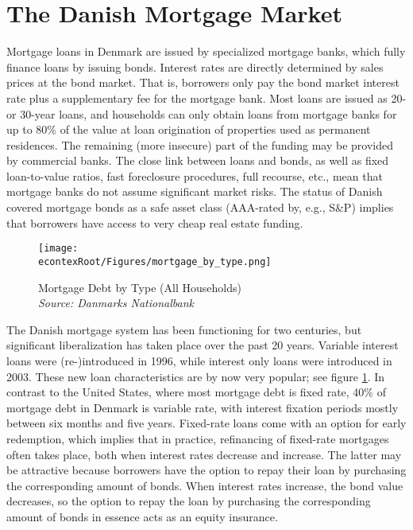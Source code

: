 \documentclass[titlepage]{\econtex}\newcommand{\texname}{ConsumptionHeterogeneity}
\begin{document}
\section{The Danish Mortgage Market} \label{mortgage_market}
\setcounter{figure}{0}   
\setcounter{table}{0} 
Mortgage loans in Denmark are issued by specialized mortgage banks, which fully finance loans by issuing bonds. Interest rates are directly determined by sales prices at the bond market. That is, borrowers only pay the bond market interest rate plus a supplementary fee for the mortgage bank. 
Most loans are issued as 20- or 30-year loans, and households can only obtain loans from mortgage banks for up to 80\% of the value at loan origination of properties used as permanent residences. The remaining (more insecure) part of the funding may be provided by commercial banks. The close link between loans and bonds, as well as fixed loan-to-value ratios, fast foreclosure procedures, full recourse, etc., mean that mortgage banks do not assume significant market risks. The status of Danish covered mortgage bonds as a safe asset class (AAA-rated by, e.g., S\&P) implies that borrowers have access to very cheap real estate funding.

\begin{figure} 
	\begin{centering}
		\texttt{[image: \\econtexRoot/Figures/mortgage\_by\_type.png]} 
		\caption{Mortgage Debt by Type (All Households)
		{\\ \emph{\footnotesize
	{Source: Danmarks Nationalbank}}
	}}
		\label{fig:mortgage_by_type}
	\end{centering}
\end{figure}

The Danish mortgage system has been functioning for two centuries, but significant liberalization has taken place over the past 20 years. Variable interest loans were (re-)introduced in 1996, while interest only loans were introduced in 2003. These new loan characteristics are by now very popular; see figure \ref{fig:mortgage_by_type}. In contrast to the United States, where most mortgage debt is fixed rate, 40\% of mortgage debt in Denmark is variable rate, with interest fixation periods mostly between six months and five years. Fixed-rate loans come with an option for early redemption, which implies that in practice, refinancing of fixed-rate mortgages often takes place, both when interest rates decrease and increase. The latter may be attractive because borrowers have the option to repay their loan by purchasing the corresponding amount of bonds. When interest rates increase, the bond value decreases, so the option to repay the loan by purchasing the corresponding amount of bonds in essence acts as an equity insurance.  
\end{document}
